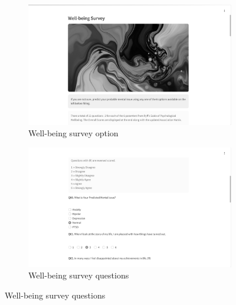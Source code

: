 \begin{figure}[H]
    \begin{subfigure}[b]{0.495\textwidth}
        \centering
        \includegraphics[width=\textwidth]{App Images/28 Interface.png}
        \caption{Well-being survey option}
        \label{fig:wellbeing_questions}
    \end{subfigure}
    \hfill
    \begin{subfigure}[b]{0.495\textwidth}
        \centering
        \includegraphics[width=\textwidth]{App Images/29 Interface.png}
        \caption{Well-being survey questions}
        \label{fig:wellbeing_result}
    \end{subfigure}
    
    \vspace{1em}


\end{figure}
